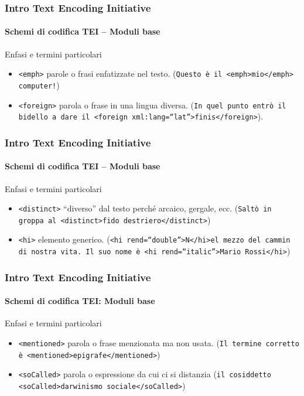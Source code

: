 \begin{frame}
	\frametitle{Intro Text Encoding Initiative}
	\framesubtitle{Schemi di codifica TEI – Moduli base}
	\addtocounter{nframe}{1}

	\begin{block}{Enfasi e termini particolari}
       
        \begin{itemize}
            \item \texttt{<emph>} parole o frasi enfatizzate nel testo. (\texttt{Questo è il <emph>mio</emph> computer!})
            \item \texttt{<foreign>} parola o frase in una lingua diversa. (\texttt{In quel punto entrò il bidello a dare il <foreign xml:lang=``lat''>finis</foreign>}).
        \end{itemize}
    \end{block}

\end{frame}

\begin{frame}
	\frametitle{Intro Text Encoding Initiative}
	\framesubtitle{Schemi di codifica TEI – Moduli base}
	\addtocounter{nframe}{1}

	\begin{block}{Enfasi e termini particolari}
       
        \begin{itemize}
            \item \texttt{<distinct>} “diverso” dal testo perché arcaico, gergale, ecc. (\texttt{Saltò in groppa al <distinct>fido destriero</distinct>})
            \item \texttt{<hi>} elemento generico. (\texttt{<hi rend=``double''>N</hi>el mezzo del cammin di nostra vita.
            Il suo nome è <hi rend=``italic''>Mario Rossi</hi>})
        \end{itemize}
    \end{block}

\end{frame}

\begin{frame}
	\frametitle{Intro Text Encoding Initiative}
	\framesubtitle{Schemi di codifica TEI: Moduli base}
	\addtocounter{nframe}{1}

    \begin{block}{Enfasi e termini particolari}
        \begin{itemize}
            \item  \texttt{<mentioned>} parola o frase menzionata ma non usata.
            (\texttt{Il termine corretto è <mentioned>epigrafe</mentioned>})
            \item \texttt{<soCalled>} parola o espressione da cui ci si distanzia
            (\texttt{il cosiddetto <soCalled>darwinismo sociale</soCalled>})
        \end{itemize}
    \end{block}
    
\end{frame}

